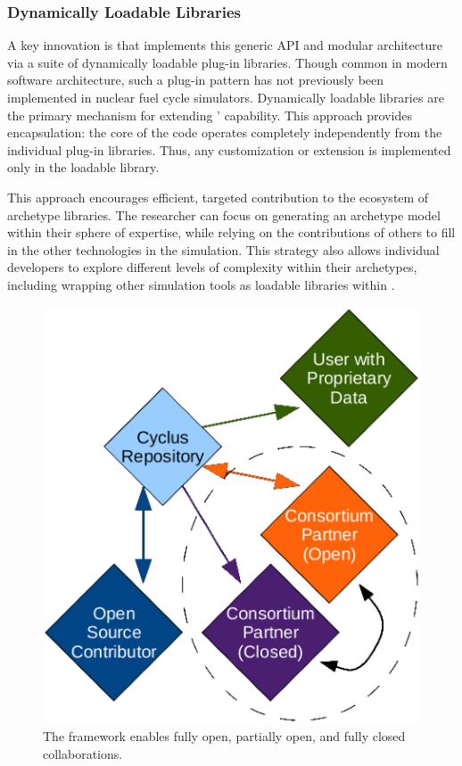 \subsubsection{Dynamically Loadable Libraries}

A key innovation is that \Cyclus  implements this generic \gls{API} and modular 
architecture via a suite of dynamically loadable plug-in libraries.  Though 
common in modern software architecture, such a plug-in pattern has 
not previously been implemented in nuclear fuel cycle simulators.  
Dynamically loadable libraries are the primary mechanism for extending \Cyclus' capability. This approach provides encapsulation: the core of the code operates
completely independently from the individual plug-in libraries. Thus, any
customization or extension is implemented only in the loadable
library. 

This approach encourages efficient, targeted contribution to the ecosystem of 
archetype libraries.  The 
researcher can focus on generating an archetype model within their
sphere of expertise, while relying on the contributions of others to fill 
in the other technologies in the simulation.  This strategy also allows individual developers to
explore different levels of complexity within their archetypes, including
wrapping other simulation tools as loadable libraries within \Cyclus.

\begin{figure}[htbp!]
\begin{center}
\includegraphics{./images/modifiedopen.eps}
\end{center}
\caption{The \Cyclus framework enables fully open, partially open, and fully
closed collaborations\cite{carlsen_cyclus_2014}.}
\label{fig:modifiedopen}
\end{figure}


